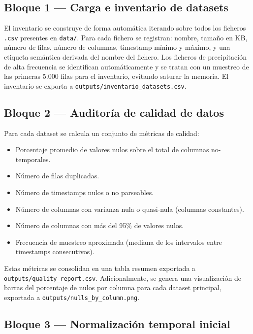 \documentclass[12pt, a4paper]{article}
\begin{document}
\subsection{Bloque 1 — Carga e inventario de datasets}

El inventario se construye de forma automática iterando sobre todos los ficheros \texttt{.csv} presentes en \texttt{data/}. Para cada fichero se registran: nombre, tamaño en KB, número de filas, número de columnas, timestamp mínimo y máximo, y una etiqueta semántica derivada del nombre del fichero. Los ficheros de precipitación de alta frecuencia se identifican automáticamente y se tratan con un muestreo de las primeras 5.000 filas para el inventario, evitando saturar la memoria. El inventario se exporta a \texttt{outputs/inventario\_datasets.csv}.

\subsection{Bloque 2 — Auditoría de calidad de datos}

Para cada dataset se calcula un conjunto de métricas de calidad:

\begin{itemize}[leftmargin=1.5cm]
    \item Porcentaje promedio de valores nulos sobre el total de columnas no-temporales.
    \item Número de filas duplicadas.
    \item Número de timestamps nulos o no parseables.
    \item Número de columnas con varianza nula o quasi-nula (columnas constantes).
    \item Número de columnas con más del 95\% de valores nulos.
    \item Frecuencia de muestreo aproximada (mediana de los intervalos entre timestamps consecutivos).
\end{itemize}

Estas métricas se consolidan en una tabla resumen exportada a \texttt{outputs/quality\_report.csv}. Adicionalmente, se genera una visualización de barras del porcentaje de nulos por columna para cada dataset principal, exportada a \texttt{outputs/nulls\_by\_column.png}.

\subsection{Bloque 3 — Normalización temporal inicial}
\end{document}

